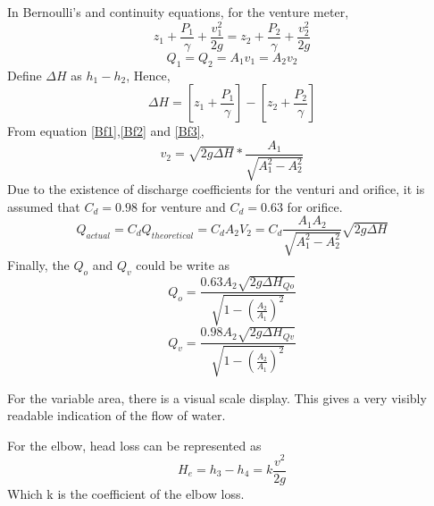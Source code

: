 In Bernoulli's and continuity equations, for the venture meter,
\begin{equation}
    z_1+\frac{P_1}{\gamma}+\frac{v_1^2}{2g}=z_2+\frac{P_2}{\gamma}+\frac{v_2^2}{2g}
    \label{Be1}
\end{equation}
\begin{equation}
    Q_1=Q_2=A_1v_1=A_2v_2
    \label{Be2}
\end{equation}
Define $\Delta H$ as $h_1 - h_2 $, Hence,
\begin{equation}
    \Delta H=\left[z_1+\frac{P_1}{\gamma}\right]-\left[z_2+\frac{P_2}{\gamma}\right]
    \label{Be3}
\end{equation}
From equation \eqref{Bf1},\eqref{Bf2} and \eqref{Bf3}, 
\begin{equation}
    v_2=\sqrt{2g\Delta H}*\frac{A_1}{\sqrt{A_1^2-A_2^2}}
    \label{Be4}
\end{equation}
Due to the existence of discharge coefficients for the venturi and orifice, 
it is assumed that $C_d=0.98$ for venture and $C_d=0.63$ for orifice.
\begin{equation}
    Q_{actual}=C_d Q_{theoretical}=C_dA_2V_2=C_d\frac{A_1A_2}{\sqrt{A_1^2-A_2^2}}\sqrt{2g\Delta H}
    \label{Be5}
\end{equation}
Finally, the $Q_o$ and $Q_v$ could be write as
\begin{equation}
   Q_o=\frac{0.63A_2\sqrt{2g\Delta H_{Qo}}}{\sqrt{1-(\frac{A_2}{A_1})^2}}
    \label{Be6}
\end{equation}
\begin{equation}
    Q_v=\frac{0.98A_2\sqrt{2g\Delta H_{Qv}}}{\sqrt{1-(\frac{A_2}{A_1})^2}}
     \label{Be7}
 \end{equation}
 
For the variable area, there is a visual scale display.
This gives a very visibly readable indication of the flow of water.

For the elbow, head loss can be represented as 
\begin{equation}
    H_e=h_3-h_4=k\frac{v^2}{2g}
    \label{Be8}
\end{equation}
Which k is the coefficient of the elbow loss.


